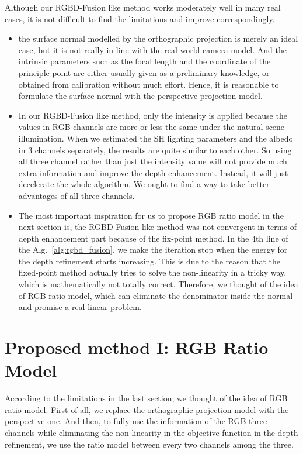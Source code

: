 Although our RGBD-Fusion like method works moderately well in many real cases, it is not difficult to find the limitations and improve correspondingly.
\begin{itemize}
\item the surface normal modelled by the orthographic projection is merely an ideal case, but it is not really in line with the real world camera model.
And the intrinsic parameters such as the focal length and the coordinate of the principle point are either usually given as a preliminary knowledge, or obtained from calibration without much effort.
Hence, it is reasonable to formulate the surface normal with the perspective projection model.

\item In our RGBD-Fusion like method, only the intensity is applied because the values in RGB channels are more or less the same under the natural scene illumination. 
When we estimated the SH lighting parameters and the albedo in 3 channels separately, the results are quite similar to each other.
So using all three channel rather than just the intensity value will not provide much extra information and improve the depth enhancement. 
Instead, it will just decelerate the whole algorithm.
We ought to find a way to take better advantages of all three channels.

\item The most important inspiration for us to propose RGB ratio model in the next section is, the RGBD-Fusion like method was not convergent in terms of depth enhancement part because of the fix-point method.
In the $4$th line of the Alg.~\ref{alg:rgbd_fusion}, we make the iteration stop when the energy for the depth refinement starts increasing.
This is due to the reason that the fixed-point method actually tries to solve the non-linearity in a tricky way, which is mathematically not totally correct. 
Therefore, we thought of the idea of RGB ratio model, which can eliminate the denominator inside the normal and promise a real linear problem.

\end{itemize}


\section{Proposed method I: RGB Ratio Model}

According to the limitations in the last section, we thought of the idea of RGB ratio model.
First of all, we replace the orthographic projection model with the perspective one.
And then, to fully use the information of the RGB three channels while eliminating the non-linearity in the objective function in the depth refinement, we use the ratio model between every two channels among the three.

